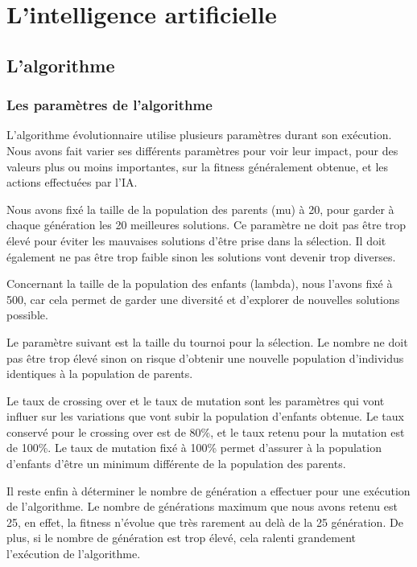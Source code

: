 \section{L'intelligence artificielle}

\subsection{L'algorithme}
	
	\subsubsection{Les paramètres de l'algorithme}
	
		L'algorithme évolutionnaire utilise plusieurs paramètres durant son exécution.
		Nous avons fait varier ses différents paramètres pour voir leur impact, pour des valeurs plus ou moins importantes,
		sur la fitness généralement obtenue, et les actions effectuées par l'IA.
		
		Nous avons fixé la taille de la population des parents (mu) à 20, pour garder à chaque génération les 20 meilleures
		solutions. Ce paramètre ne doit pas être trop élevé pour éviter les mauvaises solutions d'être prise dans la sélection.
		Il doit également ne pas être trop faible sinon les solutions vont devenir trop diverses.
		
		Concernant la taille de la population des enfants (lambda), nous l'avons fixé à 500, car cela permet de garder une diversité et d'explorer de nouvelles solutions possible.
		
		Le paramètre suivant est la taille du tournoi pour la sélection. Le nombre ne doit pas être trop élevé sinon
		on risque d'obtenir une nouvelle population d'individus identiques à la population de parents.
		
		Le taux de crossing over et le taux de mutation sont les paramètres qui vont influer sur les variations
		que vont subir la population d'enfants obtenue. Le taux conservé pour le crossing over est de 80\%, et le taux
		retenu pour la mutation est de 100\%. Le taux de mutation fixé à 100\% permet d'assurer à la population d'enfants
		d'être un minimum différente de la population des parents.
		
		Il reste enfin à déterminer le nombre de génération a effectuer pour une exécution de l'algorithme.
		Le nombre de générations maximum que nous avons retenu est 25, en effet, la fitness n'évolue que très 
		rarement au delà de la 25\ieme{} génération. De plus, si le nombre de génération est trop élevé, cela
		ralenti grandement l'exécution de l'algorithme.
	
